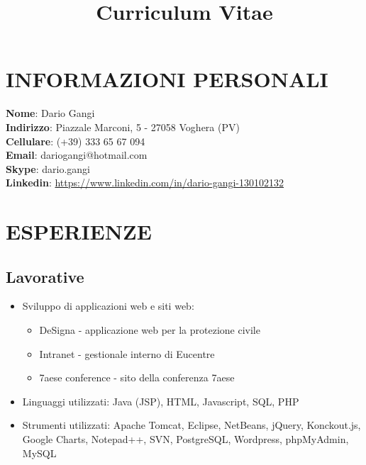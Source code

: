 \documentclass[11pt,a4paper,sans]{moderncv} %
\title{Curriculum Vitae}
\begin{document}

\makecvtitle %

\section{INFORMAZIONI PERSONALI}
\textbf{Nome}: \hspace{8mm} Dario Gangi
\\
\textbf{Indirizzo}: \hspace{4mm} Piazzale Marconi, 5 - 27058 Voghera (PV)
\\
\textbf{Cellulare}: \hspace{4.5mm} (+39) 333 65 67 094
\\
\textbf{Email}: \hspace{9mm} dariogangi@hotmail.com
\\
\textbf{Skype}: \hspace{8.5mm} dario.gangi
\\
\textbf{Linkedin}: \hspace{5.0mm} \url{https://www.linkedin.com/in/dario-gangi-130102132}


\section{ESPERIENZE}

\subsection{Lavorative}

{
	\begin{itemize}
		\item Sviluppo di applicazioni web e siti web:
		\begin{itemize}
			\item DeSigna - applicazione web per la protezione civile
			\item Intranet - gestionale interno di Eucentre
			\item 7aese conference - sito della conferenza 7aese 
		\end{itemize}
		\item Linguaggi utilizzati: Java (JSP), HTML, Javascript, SQL, PHP
		\item Strumenti utilizzati: Apache Tomcat, Eclipse, NetBeans, jQuery, Konckout.js, Google Charts, Notepad++, SVN, PostgreSQL, Wordpress, phpMyAdmin, MySQL
	\end{itemize}
}
\end{document}
